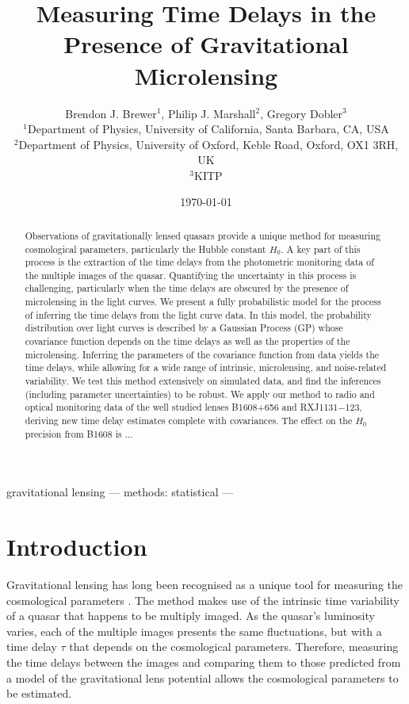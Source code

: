 \documentclass[useAMS,usenatbib, a4paper]{mn2e} \usepackage{natbib}
\title[Measuring Time Delays]
{Measuring Time Delays in the Presence of Gravitational Microlensing}
\author[B. J. Brewer]{Brendon J. Brewer$^1$, Philip J. Marshall$^2$, Gregory Dobler$^3$ \\
$^1$Department of Physics, University of California, Santa Barbara, CA, USA \\
$^2$Department of Physics, University of Oxford, Keble Road, Oxford, OX1 3RH, UK \\
$^3$KITP}
\begin{document}
 

\date{\today} 
\pagerange{\pageref{firstpage}--\pageref{lastpage}}  
\maketitle \label{firstpage}


\begin{abstract}

Observations of gravitationally lensed quasars provide a unique method for
measuring cosmological parameters, particularly the Hubble constant $H_0$.
A key part of
this process is the extraction of the time delays from the photometric
monitoring data of the multiple images of the quasar. Quantifying the
uncertainty in this process is challenging, particularly when the time delays
are obscured by the presence of microlensing in the light curves. We present a
fully probabilistic model for the process of inferring the time delays from
the light curve data. In this model, the probability distribution over light
curves is described by a Gaussian Process (GP) whose covariance function
depends on the time delays as well as the properties of the microlensing.
Inferring the parameters of the covariance function from data yields
the time delays, while allowing for a wide range of intrinsic, microlensing, and 
noise-related variability. We test this method extensively on simulated data, 
and find the inferences (including parameter uncertainties) to be robust.
We apply our method to radio and optical monitoring data of the well
studied lenses B1608+656 and RXJ1131$-$123, deriving new time delay estimates complete 
with covariances. The effect on the $H_0$ precision from B1608 is ...

\end{abstract}

\begin{keywords} gravitational lensing --- methods: statistical --- 
\end{keywords}


\section{Introduction} 

Gravitational lensing has long been recognised as a unique tool for measuring
the cosmological parameters \citep{schechter}. The method makes use of the
intrinsic time variability of a quasar that happens to be multiply imaged. As
the quasar's luminosity varies, each of the multiple images presents the same
fluctuations, but with a time delay $\tau$ that depends on the cosmological
parameters. Therefore, measuring the time delays between the images and
comparing them to those predicted from a model of the gravitational lens
potential allows the cosmological parameters to be estimated.
\end{document}
